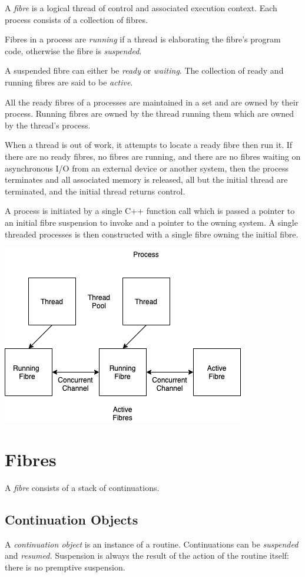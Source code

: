 \documentclass[oneside]{book}
\begin{document}
A {\em fibre} is a logical thread of control and associated execution
context. Each process consists of a collection of fibres. 

Fibres in a process are {\em running} if a thread is elaborating the
fibre's program code, otherwise the fibre is {\em suspended}. 

A suspended fibre can either be {\em ready} or {\em waiting}.
The collection of ready and running fibres are said to be {\em active}.

All the ready fibres of a processes are maintained in a set and
are owned by their process. Running fibres are owned by the thread
running them which are owned by the thread's process.

When a thread is out of work, it attempts to locate a 
ready fibre then run it. If there are no ready fibres,
no fibres are running, and there are no fibres waiting on
asynchronous I/O from an external device or another system,
then the process terminates and all associated memory is released,
all but the initial thread are terminated, and the initial thread
returns control.

A process is initiated by a single C++ function call
which is passed a pointer to an initial fibre suspension to invoke
and a pointer to the owning system. A single threaded processes
is then constructed with a single fibre owning the initial 
fibre.

\includegraphics{../src/tex/process.png}


\section{Fibres}

A {\em fibre} consists of a stack of continuations.

\subsection{Continuation Objects} 
A {\em continuation object} is an instance of a routine. Continuations can
be {\em suspended} and {\em resumed.} Suspension is always the result
of the action of the routine itself: there is no premptive suspension.
\end{document}
